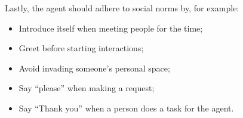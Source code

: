 Lastly, the agent should adhere to social norms by, for example:
\begin{itemize}
	\item Introduce itself when meeting people for the time;
	\item Greet before starting interactions;
	\item Avoid invading someone's personal space;
	\item Say ``please'' when making a request;
	\item Say ``Thank you'' when a person does a task for the agent.
\end{itemize}